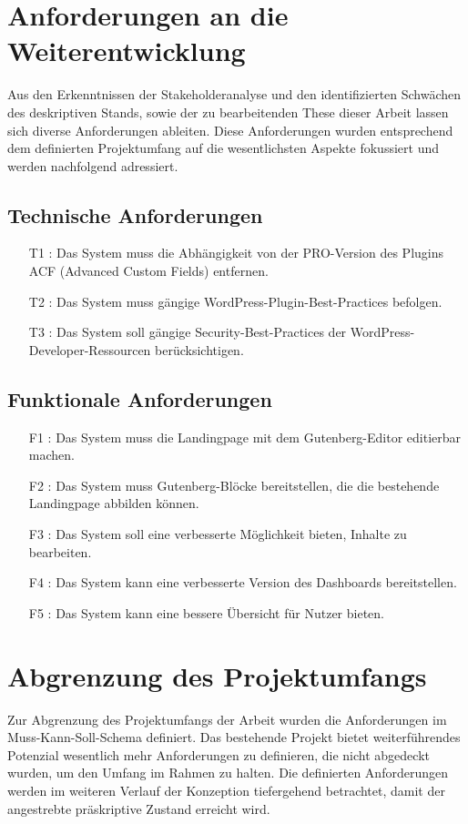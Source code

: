 \section{Anforderungen an die Weiterentwicklung}
Aus den Erkenntnissen der Stakeholderanalyse und den identifizierten Schwächen des deskriptiven Stands, sowie der zu bearbeitenden These dieser Arbeit lassen sich diverse Anforderungen ableiten.
Diese Anforderungen wurden entsprechend dem definierten Projektumfang auf die wesentlichsten Aspekte fokussiert und werden nachfolgend adressiert.

\subsection{Technische Anforderungen}
\begin{itemize}
    \item [T1]: Das System muss die Abhängigkeit von der PRO-Version des Plugins ACF (Advanced Custom Fields) entfernen.
    \item [T2]: Das System muss gängige WordPress-Plugin-Best-Practices befolgen.
    \item [T3]: Das System soll gängige Security-Best-Practices der WordPress-Developer-Ressourcen berücksichtigen.
\end{itemize}

\subsection{Funktionale Anforderungen}
\begin{itemize}
    \item [F1]: Das System muss die Landingpage mit dem Gutenberg-Editor editierbar machen.
    \item [F2]: Das System muss Gutenberg-Blöcke bereitstellen, die die bestehende Landingpage abbilden können.
    \item [F3]: Das System soll eine verbesserte Möglichkeit bieten, Inhalte zu bearbeiten.
    \item [F4]: Das System kann eine verbesserte Version des Dashboards bereitstellen.
    \item [F5]: Das System kann eine bessere Übersicht für Nutzer bieten.
\end{itemize}

\section{Abgrenzung des Projektumfangs}
Zur Abgrenzung des Projektumfangs der Arbeit wurden die Anforderungen im Muss-Kann-Soll-Schema definiert.
Das bestehende Projekt bietet weiterführendes Potenzial wesentlich mehr Anforderungen zu definieren, die nicht abgedeckt wurden, um den Umfang im Rahmen zu halten.
Die definierten Anforderungen werden im weiteren Verlauf der Konzeption tiefergehend betrachtet, damit der angestrebte präskriptive Zustand erreicht wird.


